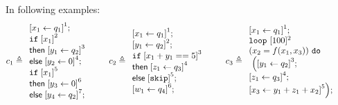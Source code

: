 \documentclass[a4paper,11pt]{article}
\begin{document}
\noindent
In following examples:
\[
c_1 \triangleq
\begin{array}{l}
     \left[x_1 \leftarrow q_1 \right]^1; \\
    \eif \; \left[x_1 \right]^2\; \\
    \mathsf{then} \; \left[y_1 \leftarrow q_2 \right]^3\; \\
    \mathsf{else} \; \left[y_2 \leftarrow 0 \right]^4; \\
    \eif \; \left[x_1 \right]^5\; \\
    \mathsf{then} \; \left[ y_3 \leftarrow 0 \right]^6\; \\
    \mathsf{else} \; \left[y_4 \leftarrow q_2 \right]^7; \\
\end{array}
%
%
\hspace{20pt}
%
c_2 \triangleq
\begin{array}{l}
   \left[ x_1 \leftarrow q_1 \right]^1; \\
   \left[y_1 \leftarrow q_2\right]^2 ; \\
    \eif \;\left[ x_1 + y_1 == 5 \right]^3\; \\
    \mathsf{then} \;\left[ z_1 \leftarrow q_3\right]^4 \; \\
    \mathsf{else} \;\left[ \eskip\right]^5 ; \\
   \left[ w_1 \leftarrow q_4 \right]^6; \\
\end{array}
\hspace{20pt}
%
c_3 \triangleq
\begin{array}{l}
     \left[x_1 \leftarrow q_1 \right]^1 ; \\
    \eloop ~ [100]^{2} ~\\
    (x_2 = f(x_1,x_3) ) ~ \edo
    \\
    ~ \Big( 
    \left[y_1 \leftarrow q_2 \right]^3; \\
    \left[z_1 \leftarrow q_3 \right]^4; \\
    \left[x_3 \leftarrow y_1 + z_1 + x_2 \right]^5
    \Big) ;
\end{array}
%
\hspace{20pt}
%
\]
\end{document}
